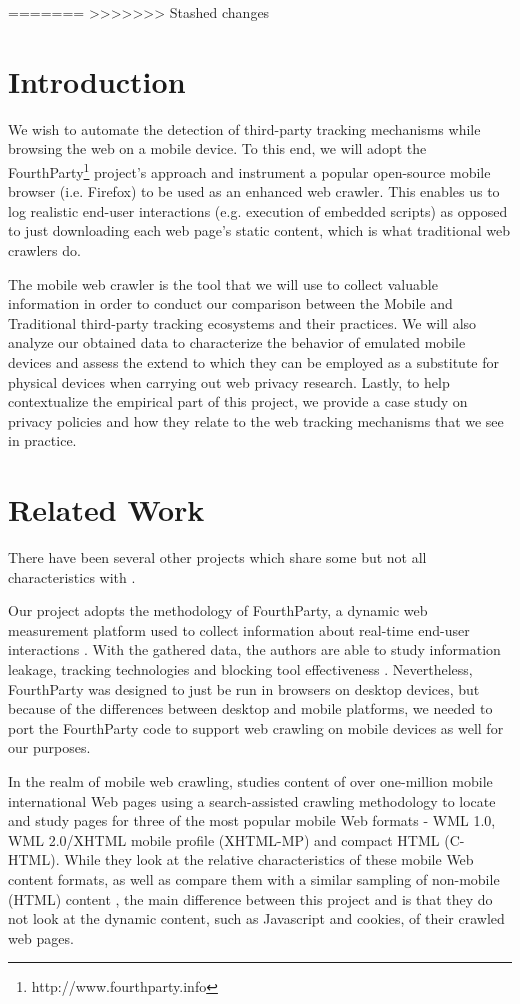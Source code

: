 \documentclass{acm_proc_article-sp}
\begin{document}
=======
>>>>>>> Stashed changes


\section{Introduction}
We wish to automate the detection of third-party tracking mechanisms while browsing the web on a mobile device. To this end, we will adopt the FourthParty\footnote{http://www.fourthparty.info} project's approach and instrument a popular open-source mobile browser (i.e. Firefox) to be used as an enhanced web crawler. This enables us to log realistic end-user interactions (e.g. execution of embedded scripts) as opposed to just downloading each web page's static content, which is what traditional web crawlers do.

The mobile web crawler is the tool that we will use to collect valuable information in order to conduct our comparison between the Mobile and Traditional third-party tracking ecosystems and their practices. We will also analyze our obtained data to characterize the behavior of emulated mobile devices and assess the extend to which they can be employed as a substitute for physical devices when carrying out web privacy research. Lastly, to help contextualize the empirical part of this project, we provide a case study on privacy policies and how they relate to the web tracking mechanisms that we see in practice.

\section{Related Work}
There have been several other projects which share some but not all characteristics with \fpm.

Our project adopts the methodology of FourthParty, a dynamic web measurement platform used to collect information about real-time end-user interactions \cite{mayer}. With the gathered data, the authors are able to study information leakage, tracking technologies and blocking tool effectiveness \cite{mayer}. Nevertheless, FourthParty was designed to just be run in browsers on desktop devices, but because of the differences between desktop and mobile platforms, we needed to port the FourthParty code to support web crawling on mobile devices as well for our purposes.

In the realm of mobile web crawling, \cite{timmins} studies content of over one-million mobile international Web pages using a search-assisted crawling methodology to locate and study pages for three of the most popular mobile Web formats - WML 1.0, WML 2.0/XHTML mobile profile (XHTML-MP) and compact HTML (C-HTML). While they look at the relative characteristics of these mobile Web content formats, as well as compare them with a similar sampling of non-mobile (HTML) content \cite{timmins}, the main difference between this project and \fpm is that they do not look at the dynamic content, such as Javascript and cookies, of their crawled web pages. 
\end{document}
